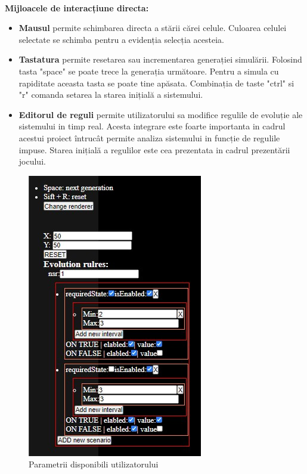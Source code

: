 \documentclass[11pt ,A4]{article}
\begin{document}
        \paragraph{}
            \textbf{Mijloacele de interacțiune directa:}
            \begin{itemize}

                \item 
                    \textbf{Mausul} permite schimbarea directa a stării cărei celule.
                    Culoarea celulei selectate se schimba pentru a evidenția selecția acesteia.

                \item 
                    \textbf{Tastatura} permite resetarea sau incrementarea generației simulării.
                    Folosind tasta "space" se poate trece la generația următoare.
                    Pentru a simula cu rapiditate aceasta tasta se poate tine apăsata.
                    Combinația de taste "ctrl" si "r" comanda setarea la starea inițială a sistemului.

                \item
                    \textbf{Editorul de reguli} permite utilizatorului sa modifice regulile de evoluție ale sistemului in timp real.
                    Acesta integrare este foarte importanta in cadrul acestui proiect întrucât permite analiza sistemului in funcție de regulile impuse.
                    Starea inițială a regulilor este cea prezentata in cadrul prezentării jocului.

            \end{itemize}
            
            \begin{figure}[H]
                \centering
                \includegraphics[scale=1]{setings}
                \caption{Parametrii disponibili utilizatorului}
            \end{figure}
\end{document}
